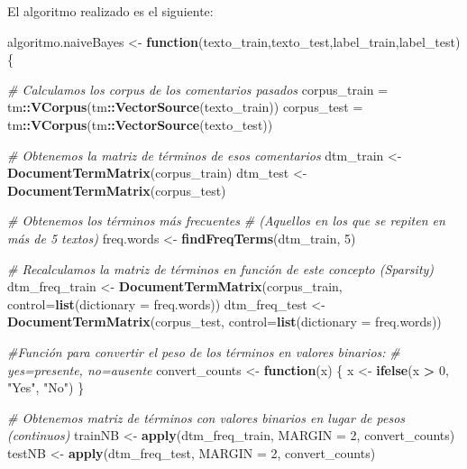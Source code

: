 \documentclass[spanish,]{article}
\newenvironment{Shaded}{\begin{snugshade}}{\end{snugshade}}
\newcommand{\KeywordTok}[1]{\textcolor[rgb]{0.13,0.29,0.53}{\textbf{#1}}}
\newcommand{\DataTypeTok}[1]{\textcolor[rgb]{0.13,0.29,0.53}{#1}}
\newcommand{\DecValTok}[1]{\textcolor[rgb]{0.00,0.00,0.81}{#1}}
\newcommand{\StringTok}[1]{\textcolor[rgb]{0.31,0.60,0.02}{#1}}
\newcommand{\CommentTok}[1]{\textcolor[rgb]{0.56,0.35,0.01}{\textit{#1}}}
\newcommand{\ControlFlowTok}[1]{\textcolor[rgb]{0.13,0.29,0.53}{\textbf{#1}}}
\newcommand{\OperatorTok}[1]{\textcolor[rgb]{0.81,0.36,0.00}{\textbf{#1}}}
\newcommand{\NormalTok}[1]{#1}
\begin{document}
El algoritmo realizado es el siguiente:

\begin{Shaded}
\begin{Highlighting}[]
\NormalTok{algoritmo.naiveBayes <-}\StringTok{ }\ControlFlowTok{function}\NormalTok{(texto_train,texto_test,label_train,label_test)\{}
  
  \CommentTok{# Calculamos los corpus de los comentarios pasados}
\NormalTok{  corpus_train =}\StringTok{ }\NormalTok{tm}\OperatorTok{::}\KeywordTok{VCorpus}\NormalTok{(tm}\OperatorTok{::}\KeywordTok{VectorSource}\NormalTok{(texto_train))}
\NormalTok{  corpus_test =}\StringTok{ }\NormalTok{tm}\OperatorTok{::}\KeywordTok{VCorpus}\NormalTok{(tm}\OperatorTok{::}\KeywordTok{VectorSource}\NormalTok{(texto_test))}
  
  \CommentTok{# Obtenemos la matriz de términos de esos comentarios}
\NormalTok{  dtm_train <-}\StringTok{ }\KeywordTok{DocumentTermMatrix}\NormalTok{(corpus_train)}
\NormalTok{  dtm_test <-}\StringTok{ }\KeywordTok{DocumentTermMatrix}\NormalTok{(corpus_test)}
  
  \CommentTok{# Obtenemos los términos más frecuentes }
  \CommentTok{# (Aquellos en los que se repiten en más de 5 textos)}
\NormalTok{  freq.words <-}\StringTok{ }\KeywordTok{findFreqTerms}\NormalTok{(dtm_train, }\DecValTok{5}\NormalTok{)}
  
  \CommentTok{# Recalculamos la matriz de términos en función de este concepto (Sparsity)}
\NormalTok{  dtm_freq_train <-}\StringTok{ }\KeywordTok{DocumentTermMatrix}\NormalTok{(corpus_train, }\DataTypeTok{control=}\KeywordTok{list}\NormalTok{(}\DataTypeTok{dictionary =}\NormalTok{ freq.words))}
\NormalTok{  dtm_freq_test <-}\StringTok{ }\KeywordTok{DocumentTermMatrix}\NormalTok{(corpus_test, }\DataTypeTok{control=}\KeywordTok{list}\NormalTok{(}\DataTypeTok{dictionary =}\NormalTok{ freq.words))}
  
  \CommentTok{#Función para convertir el peso de los términos en valores binarios: }
  \CommentTok{# yes=presente, no=ausente}
\NormalTok{  convert_counts <-}\StringTok{ }\ControlFlowTok{function}\NormalTok{(x) \{}
\NormalTok{    x <-}\StringTok{ }\KeywordTok{ifelse}\NormalTok{(x }\OperatorTok{>}\StringTok{ }\DecValTok{0}\NormalTok{, }\StringTok{"Yes"}\NormalTok{, }\StringTok{"No"}\NormalTok{)}
\NormalTok{  \}}
  
  \CommentTok{# Obtenemos matriz de términos con valores binarios en lugar de pesos (continuos)}
\NormalTok{  trainNB <-}\StringTok{ }\KeywordTok{apply}\NormalTok{(dtm_freq_train, }\DataTypeTok{MARGIN =} \DecValTok{2}\NormalTok{, convert_counts)}
\NormalTok{  testNB <-}\StringTok{ }\KeywordTok{apply}\NormalTok{(dtm_freq_test, }\DataTypeTok{MARGIN =} \DecValTok{2}\NormalTok{, convert_counts)}
  

\end{Highlighting}
\end{Shaded}
\end{document}
